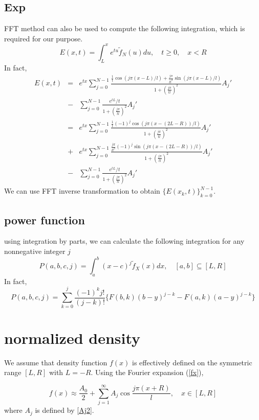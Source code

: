 \documentclass[numreferences]{kluwer}    %
\begin{document}
\begin{article}
\subsection{Exp}
FFT method can also be used to compute the following integration,
which is required for our purpose.
\begin{equation}
E(x,t)=\int^x_L e^{tu}\tilde{f}_N(u)du,\quad t\ge 0,\quad x<R
\end{equation}
In fact,
\begin{eqnarray}
E(x,t)&=&e^{tx}\sum_{j=0}^{N-1}\frac{\frac{1}{t}\cos(j\pi(x-L)/l) +
\frac{j\pi}{lt^2}\sin(j\pi(x-L)/l)
}{1+(\frac{j\pi}{tl})^2}A_j'\nonumber\\
&-&\sum_{j=0}^{N-1}\frac{e^{tL}/t}{1+(\frac{j\pi}{tl})^2}A_j'\nonumber\\
&=&e^{tx}\sum_{j=0}^{N-1}\frac{\frac{1}{t}(-1)^j\cos(j\pi(x-(2L-R))/l)}{1+(\frac{j\pi}{tl})^2}A_j'\nonumber\\
& +&e^{tx}\sum_{j=0}^{N-1}
\frac{\frac{j\pi}{lt^2}(-1)^j\sin(j\pi(x-(2L-R))/l)
}{1+(\frac{j\pi}{tl})^2}A_j'\\
&-&\sum_{j=0}^{N-1}\frac{e^{tL}/t}{1+(\frac{j\pi}{tl})^2}A_j' \label{Ext}
\end{eqnarray}
We can use FFT inverse transformation to obtain
$\{E(x_k,t)\}_{k=0}^{N-1}$.

\subsection{power function}
using integration by parts, we can calculate the following integration for any nonnegative integer $j$
\[
P(a,b,c,j)=\int^{b}_a(x-c)^j \tilde{f}_X(x)dx, \quad
[a,b]\subseteq [L,R]
\]
In fact,
\begin{equation}\label{pyd}
P(a,b,c,j)=\sum_{k=0}^{j}\frac{(-1)^{k} j! }{(j-k)!}
\{F(b,k)(b-y)^{j-k}-F(a,k)(a-y)^{j-k}\}
\end{equation}

\section{normalized density}
We assume that density function $f(x)$ is effectively defined on the symmetric range $[L,R]$ with $L=-R$.  Using the Fourier expansion (\ref{fx}),  %

\begin{equation}\label{f2_v2}
f(x)\approx  \frac{A_0}2 + \sum_{j=1}^{\infty}A_j \cos\frac{j\pi(x+R)}l ,
\quad x\in [L,R]
\end{equation}
where $A_j$ is defined by \ref{Aj2}.


\end{article}
\end{document}
